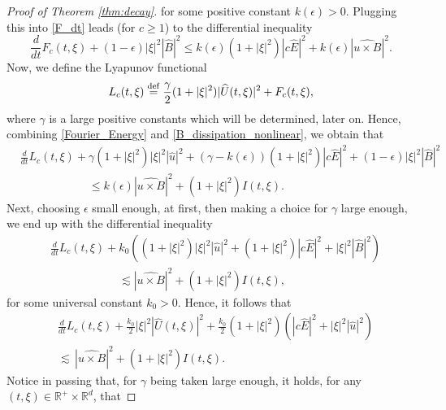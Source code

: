 \documentclass[11pt, leqno, a4paper,]{amsart}
\theoremstyle{remark}
\numberwithin{equation}{section}
\newcommand*{\bydef}{\overset{\rm def}{=}}
\begin{document}
\begin{proof}[Proof of Theorem \ref{thm:decay}]
for some positive constant $k(\epsilon)>0$.
Plugging this     into \eqref{F_dt} leads (for $c\geq 1$) to the differential inequality 
\begin{equation}\label{B_dissipation_nonlinear}
\frac{d}{dt}F_c(t,\xi)
+
(1-\epsilon)|\xi|^2|\widehat B|^2
\leq
k(\epsilon)(1+|\xi|^2)|c\widehat E|^2
+
k(\epsilon)|\widehat{u\times B}|^2 .
\end{equation}
Now, we define the Lyapunov functional 
\begin{equation}\label{Lyapunov_F}
L_c(t,\xi)\bydef \frac{\gamma}{2} (1+|\xi|^2)|\widehat U(t,\xi)|^2+F_c(t,\xi),  
\end{equation}
where $\gamma$ is a large positive constants which will be determined, later on. 
Hence, combining  \eqref{Fourier_Energy} and \eqref{B_dissipation_nonlinear}, we obtain that 
\begin{equation}\label{L_dt_k}
\begin{aligned}
&\frac{d}{dt}L_c(t,\xi)+  \gamma(1+|\xi|^2)|\xi|^2| \widehat u|^2 +(\gamma-k(\epsilon))(1+|\xi|^2)|c\widehat E|^2+(1-\epsilon)|\xi|^2|\widehat B|^2\\
& \qquad \qquad \qquad\leq  k(\epsilon)|\widehat{u\times B}|^2+ (1+|\xi|^2)I(t,\xi ).
\end{aligned}
\end{equation}
Next, choosing $\epsilon$ small enough, at first, then making a choice for $\gamma$ large enough, we end up with the differential inequality  
\begin{equation}\label{L_dt_k_2}
\begin{aligned}
&\frac{d}{dt}L_c(t,\xi)+k_0\left((1+|\xi|^2)|\xi|^2|  \widehat u|^2
+(1+|\xi|^2)|c\widehat E|^2+|\xi|^2|\widehat B|^2\right) \\
& \qquad \qquad \qquad\lesssim |\widehat{u\times B}|^2+ (1+|\xi|^2)I(t,\xi ),
\end{aligned}
\end{equation}
for some universal constant $k_0>0$.
Hence, it follows that  
\begin{equation*} 
\begin{aligned}
&\frac{d}{dt}L_c(t,\xi)+\frac{k_0}{2} |\xi|^2|\widehat  U(t,\xi)|^2+\frac{k_0}{2}(1+|\xi|^2) ( |c\widehat E|^2 + |\xi|^2 |\widehat u|^2)\\
&\lesssim\, |\widehat{u\times B}|^2+ (1+|\xi|^2)I(t,\xi ). 
\end{aligned}
\end{equation*} 
Notice in passing that,   for $\gamma$ being taken large enough, it holds, for any $(t,\xi)\in \mathbb R^+\times \mathbb R^d$, that 

\end{proof}
\end{document}
